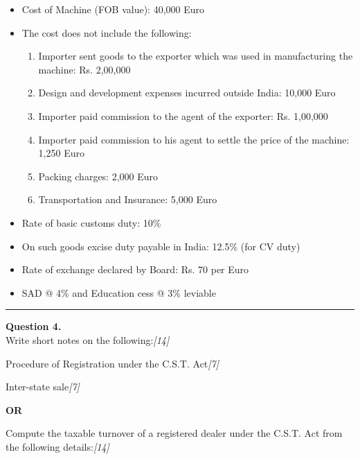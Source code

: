 \documentclass[11pt,a4paper]{article}
\newcommand{\pts}[1]{\hfill   \textit{[#1]}}
\begin{document}
\begin{itemize}[itemsep=2pt,topsep=2pt]
  \item Cost of Machine (FOB value): 40,000 Euro
  \item The cost does not include the following:
  
\begin{enumerate}[label=(\roman*),itemsep=2pt,topsep=1pt]
    \item Importer sent goods to the exporter which was used in manufacturing the machine: Rs. 2,00,000
    \item Design and development expenses incurred outside India: 10,000 Euro
    \item Importer paid commission to the agent of the exporter: Rs. 1,00,000
    \item Importer paid commission to his agent to settle the price of the machine: 1,250 Euro
    \item Packing charges: 2,000 Euro
    \item Transportation and Insurance: 5,000 Euro
  \end{enumerate}
  \item Rate of basic customs duty: 10\%
  \item On such goods excise duty payable in India: 12.5\% (for CV duty)
  \item Rate of exchange declared by Board: Rs. 70 per Euro
  \item SAD @ 4\% and Education cess @ 3\% leviable
\end{itemize}

\medskip\rule{\linewidth}{0.2pt}




\noindent   \textbf{Question 4.} \\
Write short notes on the following:\pts{14}

\begin{parts}
  \item Procedure of Registration under the C.S.T. Act\pts{7}
  \item Inter-state sale\pts{7}
\end{parts}

\centerline{   \textbf{OR}}

Compute the taxable turnover of a registered dealer under the C.S.T. Act from the following details:\pts{14}
\end{document}
